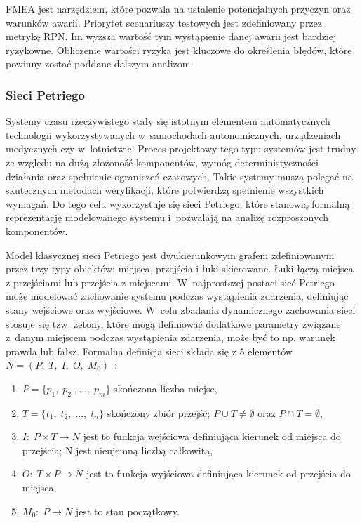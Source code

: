 \documentclass[a4paper, 12pt, twoside]{article}
\begin{document}
FMEA jest narzędziem, które pozwala na ustalenie potencjalnych przyczyn oraz warunków awarii. Priorytet scenariuszy testowych jest zdefiniowany przez metrykę RPN. Im wyższa wartość tym wystąpienie danej awarii jest bardziej ryzykowne. Obliczenie wartości ryzyka jest kluczowe do określenia błędów, które powinny zostać poddane dalszym analizom. 

\subsubsection{Sieci Petriego} \label{petri}
Systemy czasu rzeczywistego stały się istotnym elementem automatycznych technologii wykorzystywanych w~samochodach autonomicznych, urządzeniach medycznych czy w~lotnictwie. Proces projektowy tego typu systemów jest trudny ze względu na dużą złożoność komponentów, wymóg deterministyczności działania oraz spełnienie ograniczeń czasowych. Takie systemy muszą polegać na skutecznych metodach weryfikacji, które potwierdzą spełnienie wszystkich wymagań. Do tego celu wykorzystuje się sieci Petriego, które stanowią formalną reprezentację modelowanego systemu i~pozwalają na analizę rozproszonych komponentów.

Model klasycznej sieci Petriego jest dwukierunkowym grafem zdefiniowanym przez trzy typy obiektów: miejsca, przejścia i łuki skierowane. Łuki łączą miejsca z przejściami lub przejścia z miejscami. W~najprostszej postaci sieć Petriego może modelować zachowanie systemu podczas wystąpienia zdarzenia, definiując stany wejściowe oraz wyjściowe. W~celu zbadania dynamicznego zachowania sieci stosuje się tzw. żetony, które mogą definiować dodatkowe parametry związane z~danym miejscem podczas wystąpienia zdarzenia, może być to np. warunek prawda lub fałsz. Formalna definicja sieci składa się z 5 elementów \(N = (P,\; T,\; I,\; O,\; M_0) \)~\cite{petriIntro}:
\begin{enumerate}[(1)]
   \item \(P = \{p_1,\;p_2\;, …,\; p_m \} \) skończona liczba miejsc,
   \item \(T = \{t_1,\; t_2,\; …,\; t_n \} \) skończony zbiór przejść; \( P \cup T \neq \emptyset \) oraz \( P \cap T = \emptyset \),
   \item \(I:\; P \times T \rightarrow N \) jest to funkcja wejściowa definiująca kierunek od miejsca do przejścia; N jest nieujemną liczbą całkowitą,
   \item \(O:\; T \times P \rightarrow N \) jest to funkcja wyjściowa definiująca kierunek od przejścia do miejsca,
   \item \(M_0:\; P \rightarrow N \) jest to stan początkowy.
\end{enumerate}
\end{document}
